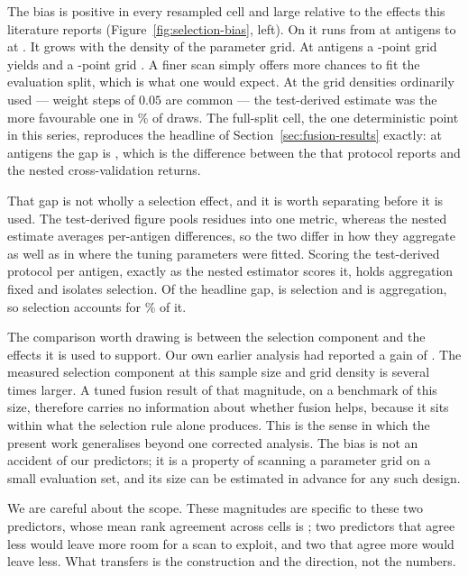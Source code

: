 The bias is positive in every resampled cell and large relative to the
effects this literature reports (Figure~\ref{fig:selection-bias}, left). On \BiasMetric{}
it runs from \BiasAtSmallestN{} at
\BiasSmallestN{} antigens to \BiasAtLargestN{} at \BiasLargestN{}. It grows
with the density of the parameter grid. At \BiasGridRefN{} antigens a
\BiasCoarseGridPoints{}-point grid yields \BiasCoarseGridBias{} and a
\BiasFineGridPoints{}-point grid \BiasFineGridBias{}. A finer scan simply
offers more chances to fit the evaluation split, which is what one would expect.
At the grid densities ordinarily used --- weight steps of \(0.05\) are
common --- the test-derived estimate was the more favourable one in
\BiasPositiveShareLargestN{}\% of draws. The full-split cell, the one
deterministic point in this series, reproduces the headline of
Section~\ref{sec:fusion-results} exactly: at \BiasFullSplitN{} antigens the
gap is \BiasFullSplitValue{}, which is the difference between the
\TunedBpThreeDeltaMcc{} that protocol reports and the
\NestedBpThreeDeltaMcc{} nested cross-validation returns.

That gap is not wholly a selection effect, and it is worth separating before
it is used. The test-derived figure pools residues into one metric, whereas the
nested estimate averages per-antigen differences, so the two differ in how they
aggregate as well as in where the tuning parameters were fitted. Scoring the
test-derived protocol per antigen, exactly as the nested estimator scores it,
holds aggregation fixed and isolates selection. Of the
\DecompHeadlineGap{} \BiasMetric{} headline gap, \DecompSelection{} is
selection and \DecompAggregation{} is aggregation, so selection accounts for
\DecompSelectionShare{}\% of it.

The comparison worth drawing is between the selection component and the effects
it is used to support. Our own earlier analysis had reported a gain of
\TunedBpThreeDeltaMcc{} \BiasMetric{}. The measured selection component at this
sample size and grid density is several times larger. A tuned fusion result of
that magnitude, on a benchmark of this size, therefore carries no information
about whether fusion helps, because it sits within what the selection rule
alone produces.
This is the sense in which the present work generalises beyond one corrected
analysis. The bias is not an accident of our predictors; it is a property of
scanning a parameter grid on a small evaluation set, and its size can be estimated in
advance for any such design.

We are careful about the scope. These magnitudes are specific to these two
predictors, whose mean rank agreement across cells is \BiasAgreement{}; two
predictors that agree less would leave more room for a scan to exploit, and
two that agree more would leave less. What transfers is the construction and
the direction, not the numbers.

